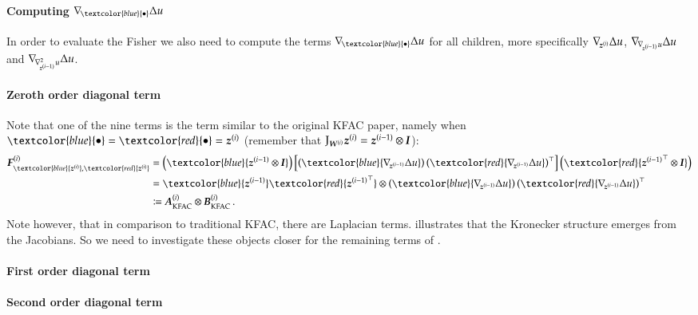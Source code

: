 \paragraph{Computing $\grad{\textcolor{blue}{\bullet}}\Delta u$}
In order to evaluate the Fisher we also need to compute the terms $\grad{\textcolor{blue}{\bullet}}\Delta u$ for all children, more specifically $\nabla_{\!{{\boldsymbol{z}}^{(i)}}}\Delta u$, $\nabla_{\!{\nabla_{\!{{\boldsymbol{z}}^{(i-1)}}}u}}\Delta u$ and $\nabla_{\!{\nabla_{\!{{\boldsymbol{z}}^{(i-1)}}}^{2}u}}\Delta u$.


\paragraph{Zeroth order diagonal term}
Note that one of the nine terms is the term similar to the original KFAC paper, namely
when $\textcolor{blue}{\bullet} = \textcolor{red}{\bullet} = \vz^{(i)}$
(remember that $\mathrm{J}_{{\boldsymbol{W}}^{(i)}} {\boldsymbol{z}}^{(i)} = {\boldsymbol{z}}^{(i-1)} \otimes {\boldsymbol{I}}$):
\begin{align}\label{eq:original-kfac}
  \begin{split}
    \mF^{(i)}_{\textcolor{blue}{\vz^{(i)}}, \textcolor{red}{\vz^{(i)}}}
    &=
      \left(
      \textcolor{blue}{\vz^{(i-1)} \otimes \mI}
      \right)
      \left[
      \left(
      \textcolor{blue}{\grad{\vz^{(i-1)}}\Delta u}
      \right)
      \left(
      \textcolor{red}{\grad{\vz^{(i-1)}}\Delta u}
      \right)^{\top}
      \right]
      \left(
      \textcolor{red}{{\vz^{(i-1)}}^{\top} \otimes \mI}
      \right)
    \\
    &=
      \textcolor{blue}{\vz^{(i-1)}}
      \textcolor{red}{{\vz^{(i-1)}}^{\top}}
      \otimes
      \left(
      \textcolor{blue}{\grad{\vz^{(i-1)}}\Delta u}
      \right)
      \left(
      \textcolor{red}{\grad{\vz^{(i-1)}}\Delta u}
      \right)^{\top}
    \\
    &\coloneqq \mA_{\text{KFAC}}^{(i)} \otimes \mB_{\text{KFAC}}^{(i)}\,.
  \end{split}
\end{align}
Note however, that in comparison to traditional KFAC, there are Laplacian terms.
 illustrates that the Kronecker structure emerges from
the Jacobians. So we need to investigate these objects closer for the remaining
terms of .


\paragraph{First order diagonal term}

\paragraph{Second order diagonal term}


